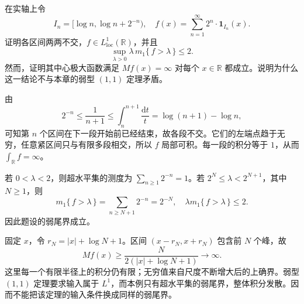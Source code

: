 \begin{optionalexercise}\label{b1:ex:13-weak-l1-infinite-maximal}
在实轴上令
\[
 I_n=[\log n,\log n+2^{-n}),\quad
 f(x)=\sum_{n=1}^{\infty}2^n\cdot\mathbf1_{I_n}(x).
\]
证明各区间两两不交，\(f\in L^1_{\mathrm{loc}}(\mathbb R)\)，并且
\[
 \sup_{\lambda>0}\lambda\,m_1\{\,f>\lambda\,\}\le2.
\]
然而，证明其中心极大函数满足 \(Mf(x)=\infty\) 对每个 \(x\in\mathbb R\) 都成立。说明为什么这一结论不与本章的弱型 \((1,1)\) 定理矛盾。
\end{optionalexercise}
\begin{solution}
由
\[
 2^{-n}\le\frac1{n+1}
 \le\int_n^{n+1}\frac{\mathrm dt}{t}
 =\log(n+1)-\log n,
\]
可知第 \(n\) 个区间在下一段开始前已经结束，故各段不交。它们的左端点趋于无穷，任意紧区间只与有限多段相交，所以 \(f\) 局部可积。每一段的积分等于 \(1\)，从而 \(\int_{\mathbb R}f=\infty\)。

若 \(0<\lambda<2\)，则超水平集的测度为 \(\sum_{n\ge1}2^{-n}=1\)。若 \(2^N\le\lambda<2^{N+1}\)，其中 \(N\ge1\)，则
\[
 m_1\{\,f>\lambda\,\}=\sum_{n\ge N+1}2^{-n}=2^{-N},
 \quad\lambda m_1\{\,f>\lambda\,\}\le2.
\]
因此题设的弱尾界成立。

固定 \(x\)，令 \(r_N=|x|+\log N+1\)。区间 \((x-r_N,x+r_N)\) 包含前 \(N\) 个峰，故
\[
 Mf(x)\ge\frac N{2(|x|+\log N+1)}\longrightarrow\infty.
\]
这里每一个有限半径上的积分仍有限；无穷值来自尺度不断增大后的上确界。弱型 \((1,1)\) 定理要求输入属于 \(L^1\)，而本例只有超水平集的弱尾界，整体积分发散。因而不能把该定理的输入条件换成同样的弱尾界。
\end{solution}

